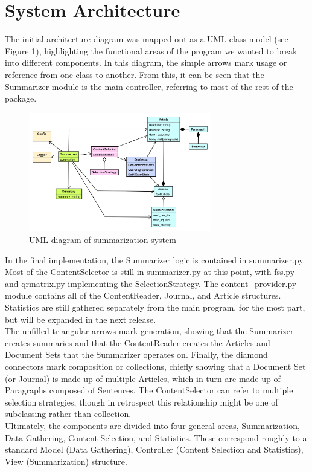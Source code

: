 \documentclass[11pt,a4paper]{article}
\begin{document}
\section{System Architecture}
The initial architecture diagram was mapped out as a UML class model (see Figure 1), highlighting the functional areas of the program we wanted to break into different components. In this diagram, the simple arrows mark usage or reference from one class to another. From this, it can be seen that the Summarizer module is the main controller, referring to most of the rest of the package.
\begin{figure}
\caption{UML diagram of summarization system}
\includegraphics[width=80mm,scale=0.5]{architecture.png}
\end{figure}
In the final implementation, the Summarizer logic is contained in summarizer.py. Most of the ContentSelector is still in summarizer.py at this point, with fss.py and qrmatrix.py implementing the SelectionStrategy. The content\_provider.py module contains all of the ContentReader, Journal, and Article structures. Statistics are still gathered separately from the main program, for the most part, but will be expanded in the next release.\\
The unfilled triangular arrows mark generation, showing that the Summarizer creates summaries and that the ContentReader creates the Articles and Document Sets that the Summarizer operates on. Finally, the diamond connectors mark composition or collections, chiefly showing that a Document Set (or Journal) is made up of multiple Articles, which in turn are made up of Paragraphs composed of Sentences. The ContentSelector can refer to multiple selection strategies, though in retrospect this relationship might be one of subclassing rather than collection.\\
Ultimately, the components are divided into four general areas, Summarization, Data Gathering, Content Selection, and Statistics. These correspond roughly to a standard Model (Data Gathering), Controller (Content Selection and Statistics), View (Summarization) structure.\\
\end{document}
